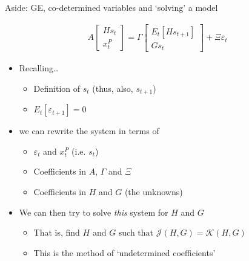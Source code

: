 \begin{frame}{Aside: GE, co-determined variables and `solving' a model}

\begin{gather*}
 A \begin{bmatrix} H s_{t} \\ x^{P}_{t} \end{bmatrix}
 =
 \Gamma 
  \begin{bmatrix}
   E_{t}[ H s_{t+1} ] \\ G s_{t}
   \end{bmatrix}
 + 
 \Xi \varepsilon_{t}
\end{gather*}

\begin{itemize}
\item	Recalling\ldots
	\begin{itemize}
	\item	Definition of $s_{t}$ (thus, also, $s_{t+1}$)
	\item	$E_{t}[ \varepsilon_{t+1} ] = 0$
	\end{itemize}
\item[] we can rewrite the system in terms of
	\begin{itemize}
	\item	$\varepsilon_{t}$ and $x^{P}_{t}$ (i.e. $s_{t}$)
	\item	Coefficients in $A$, $\Gamma$ and $\Xi$
	\item	Coefficients in $H$ and $G$ (the unknowns)
	\end{itemize}
\vspace{2mm}
\item	We can then try to solve \textit{this} system for $H$ and $G$
	\begin{itemize}
	\item	That is, find $H$ and $G$ such that $\mathcal{J}(H,G) = \mathcal{K}(H,G)$	
	\item	This is the method of `undetermined coefficients'
	\end{itemize}
\end{itemize}

\end{frame}



